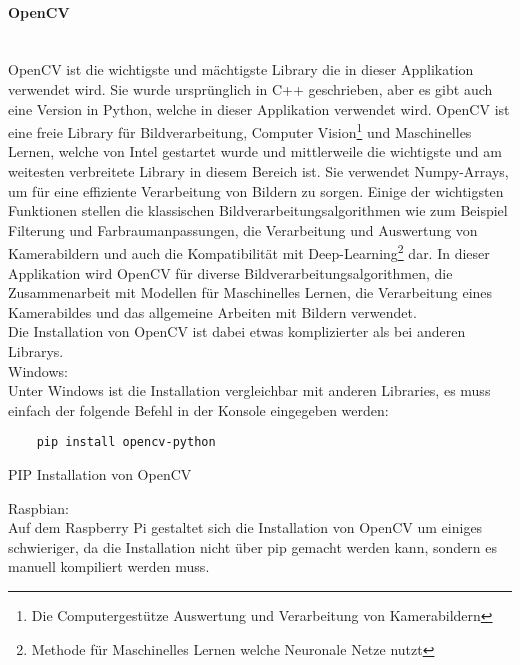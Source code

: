 \paragraph{OpenCV}\mbox{}\\
OpenCV ist die wichtigste und mächtigste Library die in dieser Applikation verwendet wird. Sie wurde ursprünglich in C++ geschrieben, 
aber es gibt auch eine Version in Python, welche in dieser Applikation verwendet wird. OpenCV ist eine freie Library für Bildverarbeitung, 
Computer Vision\footnote{Die Computergestütze Auswertung und Verarbeitung von Kamerabildern} und Maschinelles Lernen, welche von Intel gestartet wurde und mittlerweile die wichtigste und am weitesten verbreitete 
Library in diesem Bereich ist. Sie verwendet Numpy-Arrays, um für eine effiziente Verarbeitung von Bildern zu sorgen. Einige der wichtigsten 
Funktionen stellen die klassischen Bildverarbeitungsalgorithmen wie zum Beispiel Filterung und Farbraumanpassungen, die Verarbeitung und 
Auswertung von Kamerabildern und auch die Kompatibilität mit Deep-Learning\footnote{Methode für Maschinelles Lernen welche Neuronale Netze nutzt} dar. In dieser Applikation wird OpenCV für diverse 
Bildverarbeitungsalgorithmen, die Zusammenarbeit mit Modellen für Maschinelles Lernen, die Verarbeitung eines Kamerabildes und das allgemeine Arbeiten mit Bildern verwendet.\\

Die Installation von OpenCV ist dabei etwas komplizierter als bei anderen Librarys.\\

Windows:\\

Unter Windows ist die Installation vergleichbar mit anderen Libraries, es muss einfach der folgende Befehl in der Konsole eingegeben werden:

\begin{listing}[H]
    \begin{verbatim}
    pip install opencv-python
    \end{verbatim}
    \caption{PIP Installation von OpenCV}
\end{listing}

Raspbian:\\

Auf dem Raspberry Pi gestaltet sich die Installation von OpenCV um einiges schwieriger, da die Installation nicht über pip gemacht werden kann, 
sondern es manuell kompiliert werden muss.\\

